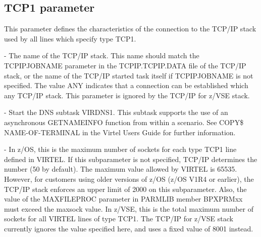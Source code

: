 \documentclass[letterpaper,10pt,english]{sphinxmanual}
\begin{document}
\ignorespaces 

\subsection{TCP1 parameter}
\label{\detokenize{Installation_Guide:tcp1-parameter}}\label{\detokenize{Installation_Guide:index-122}}
\begin{sphinxVerbatim}[commandchars=\\\{\}]
   
\PYG{p}{[}\PYG{p}{]}\PYG{p}{[}\PYG{p}{]}\PYG{p}{[}\PYG{p}{]}\PYG{p}{[}\PYG{p}{]}\PYG{p}{[}\PYG{p}{]}
\end{sphinxVerbatim}

This parameter defines the characteristics of the connection to the TCP/IP stack used by all lines which specify type TCP1.

 - The name of the TCP/IP stack. This name should match the TCPIPJOBNAME parameter in the TCPIP.TCPIP.DATA file of the TCP/IP stack, or the name of the TCP/IP started task itself if TCPIPJOBNAME is not specified. The value ANY indicates that a connection can be established which any TCP/IP stack. This parameter is ignored by the TCP/IP for z/VSE stack.

 -  Start the DNS subtask VIRDNS1. This subtask supports the use of an asynchronous GETNAMEINFO function from within a scenario. See COPY\$ NAME-OF-TERMINAL in the Virtel Users Guide for further information.

 - In z/OS, this is the maximum number of sockets for each type TCP1 line defined in VIRTEL. If this subparameter is not specified, TCP/IP determines the number (50 by default). The maximum value allowed by VIRTEL is 65535. However, for customers using older versions of z/OS (z/OS V1R4 or earlier), the TCP/IP stack enforces an upper limit of 2000 on this subparameter. Also, the value of the MAXFILEPROC parameter in PARMLIB member BPXPRMxx must exceed the maxsock value. In z/VSE, this is the total maximum number of sockets for all VIRTEL lines of type TCP1. The TCP/IP for z/VSE stack currently ignores the value specified here, and uses a fixed value of 8001 instead.
\end{document}
